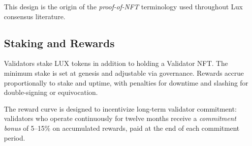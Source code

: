 This design is the origin of the \emph{proof-of-NFT} terminology
used throughout Lux consensus literature.

\subsection{Staking and Rewards}

Validators stake LUX tokens in addition to holding a Validator NFT.
The minimum stake is set at genesis and adjustable via governance.
Rewards accrue proportionally to stake and uptime, with penalties
for downtime and slashing for double-signing or equivocation.

The reward curve is designed to incentivize long-term validator
commitment: validators who operate continuously for twelve months
receive a \emph{commitment bonus} of 5--15\% on accumulated rewards,
paid at the end of each commitment period.

